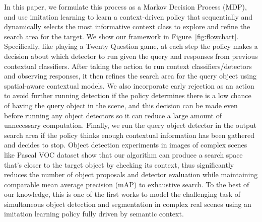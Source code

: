 In this paper, we formulate this process as a Markov Decision Process (MDP), and use imitation learning to learn a context-driven policy that sequentially and dynamically selects the most informative context class to explore and refine the search area for the target. We show our framework in Figure~\ref{fig:flowchart}.  Specifically, like playing a Twenty Question game, at each step the policy makes a decision about which detector to run given the query and responses from previous contextual classifiers. After taking the action to run context classifiers/detectors and observing responses, it then refines the search area for the query object using spatial-aware contextual models. We also incorporate early rejection as an action to avoid further running detection if the policy determines there is a low chance of having the query object in the scene, and this decision can be made even before running any object detectors so it can reduce a large amount of unnecessary computation. Finally, we run the query object detector in the output search area if the policy thinks enough contextual information has been gathered and decides to stop. Object detection experiments in images of complex scenes like Pascal VOC dataset show that our algorithm can produce a search space that's closer to the target object by checking its context, thus significantly reduces the number of object proposals and detector evaluation while maintaining comparable mean average precision (mAP) to exhaustive search. To the best of our knowledge, this is one of the first works to model the challenging task of simultaneous object detection and segmentation in complex real scenes using an imitation learning policy fully driven by semantic context.

